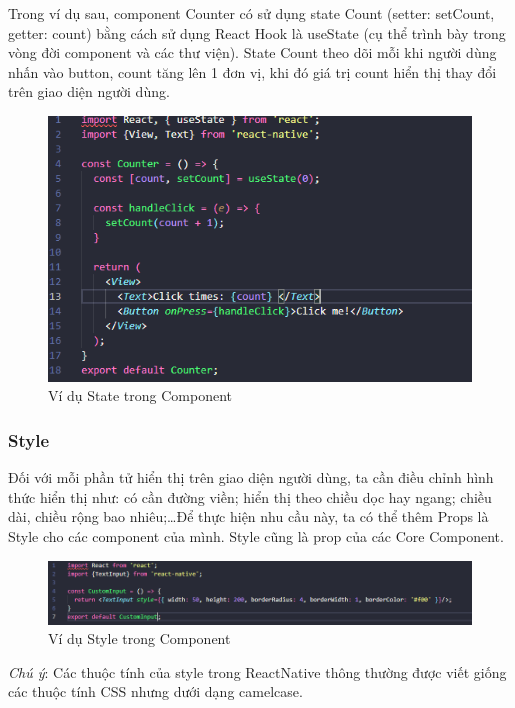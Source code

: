     Trong ví dụ sau, component Counter có sử dụng state Count (setter: setCount, getter: count) bằng cách sử dụng React Hook là useState (cụ thể trình bày trong vòng đời component và các thư viện). State Count theo dõi mỗi khi người dùng nhấn vào button, count tăng lên 1 đơn vị, khi đó giá trị count hiển thị thay đổi trên giao diện người dùng.
    \begin{figure}[!ht]
        \centering
        \includegraphics[width=1\textwidth]{images/State.png}
        \caption{Ví dụ State trong Component}
    \end{figure}
\subsubsection{Style}
    Đối với mỗi phần tử hiển thị trên giao diện người dùng, ta cần điều chỉnh hình thức hiển thị như: có cần đường viền; hiển thị theo chiều dọc hay ngang; chiều dài, chiều rộng bao nhiêu;\dots Để thực hiện nhu cầu này, ta có thể thêm Props là Style cho các component của mình. Style cũng là prop của các Core Component.
    \begin{figure}[!ht]
        \centering
        \includegraphics[width=1\textwidth]{images/StyleConponent.png}
        \caption{Ví dụ Style trong Component}
    \end{figure}

    \textit{Chú ý}: Các thuộc tính của style trong ReactNative thông thường được viết giống các thuộc tính CSS nhưng dưới dạng camelcase.
